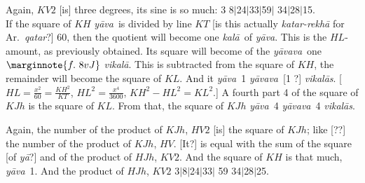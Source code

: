 \documentclass[11pt,a5paper]{book}
\def\kala{\textit{ka\-l\=a}}
\def\ya{\textit{y\=a}}
\def\yava{\textit{y\=ava}}
\def\yavava{\textit{y\=avava}}
\def\vikala{\textit{vi\-ka\-l\=a}}
\def\vikalas{\textit{vi\-ka\-l\=as}}
\def\danda{$|$}
\begin{document}
Again, $KV2$ [is] three degrees, its sine is so much: 3 8\danda 24\danda 33\danda 59\danda
34\danda 28\danda 15. \\ 

\iffalse 
\begin{center}
\texttt{[image: 8r.png]}
\captionof{figure}{8r}
\end{center}
\fi 

If the square of $KH$ \yava\ is divided by line $KT$ [is this actually 
\textit{katar-rekh\=a} for Ar.\ \textit{qa\*tar}?] 60, then the quotient  will become
one \kala\ of \yava.   This is the $HL$-amount, as previously obtained. Its square
will become of the \yavava\ one
$\marginnote{f.~8v J}$
\vikala. This is subtracted from the square of $KH$, the remainder will become the
square of $KL$.  And it \yava\ 1  \yavava\ [1 ?] \vikalas. 
[$HL = \frac{x^2}{60} = \frac{KH^2}{KT}$, $HL^2 = \frac{x^4}{3600}$,
$KH^2 - HL^2 = KL^2$.]
A fourth part 4 of the square of $KJh$  is the square of $KL$. From that, 
the square of $KJh$ \yava\ 4 \yavava\ 4 \vikalas. 

Again, the number of the product of $KJh$, $HV2$ [is] the square of $KJh$; like [??]
the number of the product of $KJh$, $HV$. [It?] is equal with the sum of the square [of
\ya?] and of the
product of $HJh$, $KV2$. And the square of $KH$ is that much, \yava\ 1. And the
product of $HJh$, $KV2$ 3\danda 8\danda 24\danda 33\danda
59 34\danda 28\danda 25. 
\end{document}
